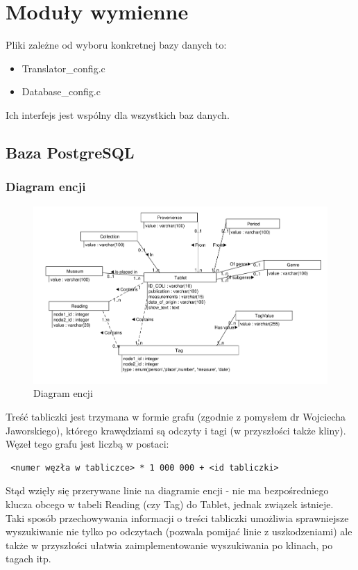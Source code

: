 \documentclass{pracamgr}
\begin{document}
\section{Moduły wymienne}
Pliki zależne od wyboru konkretnej bazy danych to:
\begin{itemize}
 \item Translator\_config.c
\item Database\_config.c
\end{itemize}
Ich interfejs jest wspólny dla wszystkich baz danych.

\subsection{Baza PostgreSQL}
\subsubsection{Diagram encji}
\begin{figure}[h]
 \centering
 \includegraphics[width=500px,bb=0 0 930 560]{./diagramy/diagram-encji-maly.pdf}
 \caption{Diagram encji}
\end{figure}
Treść tabliczki jest trzymana w formie grafu (zgodnie z pomysłem dr Wojciecha Jaworskiego), którego krawędziami są odczyty i tagi
(w przyszłości także kliny). Węzeł tego grafu jest liczbą w postaci:
\begin{verbatim}
 <numer węzła w tabliczce> * 1 000 000 + <id tabliczki>
\end{verbatim}
Stąd wzięły się przerywane linie na diagramie encji - nie ma bezpośredniego klucza obcego w tabeli Reading (czy Tag) do Tablet, 
jednak związek istnieje. Taki sposób przechowywania informacji o treści tabliczki umożliwia sprawniejsze wyszukiwanie nie tylko
po odczytach (pozwala pomijać linie z uszkodzeniami) ale także w przyszłości ułatwia zaimplementowanie wyszukiwania po klinach,
po tagach itp.
\end{document}
